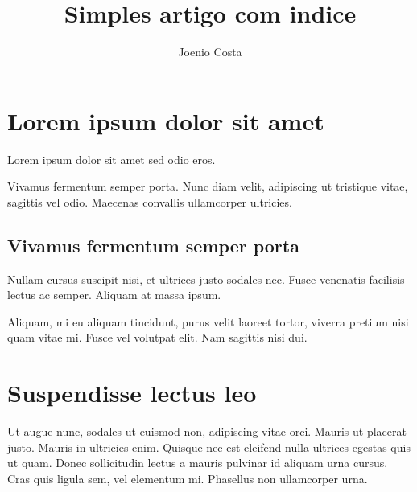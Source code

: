 \documentclass{article}
\begin{document}
\title{Simples artigo com indice}

\author{Joenio Costa}

\maketitle

\section{Lorem ipsum dolor sit amet}

Lorem ipsum dolor sit amet sed odio eros.

Vivamus fermentum semper porta. Nunc diam velit, adipiscing ut tristique
vitae, sagittis vel odio. Maecenas convallis ullamcorper ultricies.

\subsection{Vivamus fermentum semper porta}

Nullam cursus suscipit nisi, et ultrices justo sodales nec. Fusce venenatis
facilisis lectus ac semper. Aliquam at massa ipsum.

Aliquam, mi eu aliquam tincidunt, purus velit laoreet tortor, viverra pretium
nisi quam vitae mi. Fusce vel volutpat elit. Nam sagittis nisi dui.

\section{Suspendisse lectus leo}

Ut augue nunc, sodales ut euismod non, adipiscing vitae orci. Mauris ut placerat
justo. Mauris in ultricies enim. Quisque nec est eleifend nulla ultrices
egestas quis ut quam. Donec sollicitudin lectus a mauris pulvinar id aliquam
urna cursus. Cras quis ligula sem, vel elementum mi. Phasellus non ullamcorper
urna.

\printindex
\end{document}
